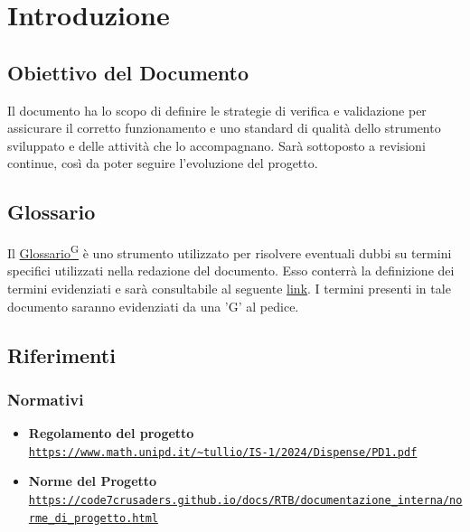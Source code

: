 \documentclass{article}
\begin{document}
\tableofcontents
\listoftables
\listoffigures



\newpage
\section{Introduzione}
\subsection{Obiettivo del Documento}
Il documento ha lo scopo di definire le strategie di verifica e validazione per assicurare il corretto funzionamento e uno standard di qualità
dello strumento sviluppato e delle attività che lo accompagnano. Sarà sottoposto a revisioni continue, così da poter seguire l'evoluzione del progetto.

\subsection{Glossario}
Il \href{https://code7crusaders.github.io/docs/PB/documentazione_interna/glossario.html#glossario}{Glossario\textsuperscript{G}} è uno strumento utilizzato per risolvere eventuali dubbi su termini specifici utilizzati nella redazione del documento. Esso conterrà la definizione dei 
termini evidenziati e sarà consultabile al seguente \href{https://code7crusaders.github.io/docs/PB/documentazione_interna/glossario.html}{link}. I termini presenti in tale documento
saranno evidenziati da una 'G' al pedice.

\subsection{Riferimenti}
\subsubsection{Normativi}
\begin{itemize}
    \item \textbf{Regolamento del progetto} \\ \texttt{\url{https://www.math.unipd.it/~tullio/IS-1/2024/Dispense/PD1.pdf}}
    \item \textbf{Norme del Progetto} \\ \texttt{\url{https://code7crusaders.github.io/docs/RTB/documentazione_interna/norme_di_progetto.html}}
\end{itemize}
\end{document}
